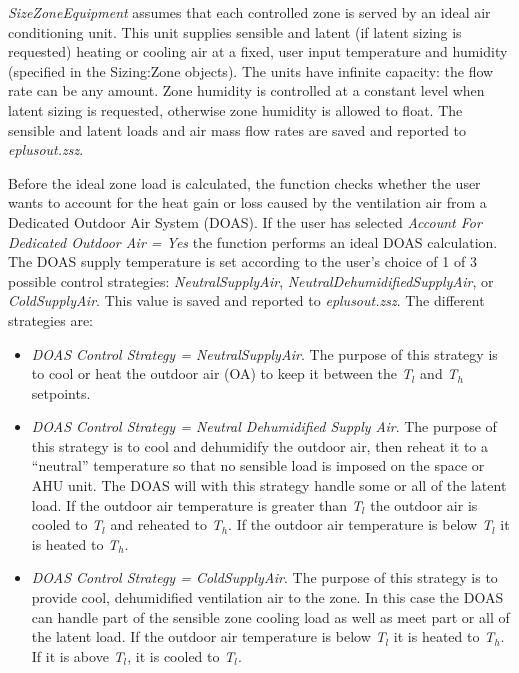 \emph{SizeZoneEquipment} assumes that each controlled zone is served by an ideal air conditioning unit. This unit supplies sensible and latent (if latent sizing is requested) heating or cooling air at a fixed, user input temperature and humidity (specified in the Sizing:Zone objects). The units have infinite capacity: the flow rate can be any amount. Zone humidity is controlled at a constant level when latent sizing is requested, otherwise zone humidity is allowed to float. The sensible and latent loads and air mass flow rates are saved and reported to \emph{eplusout.zsz}. 

Before the ideal zone load is calculated, the function checks whether the user wants to account for the heat gain or loss caused by the ventilation air from a Dedicated Outdoor Air System (DOAS). If the user has selected \emph{Account For Dedicated Outdoor Air = Yes} the function performs an ideal DOAS calculation. The DOAS supply temperature is set according to the user's choice of 1 of 3 possible control strategies: \emph{NeutralSupplyAir}, \emph{NeutralDehumidifiedSupplyAir}, or \emph{ColdSupplyAir}. This value is saved and reported to \emph{eplusout.zsz}. The different strategies are:

\begin{itemize}
\item
  \emph{DOAS Control Strategy = NeutralSupplyAir}. The purpose of this strategy is to cool or heat the outdoor air (OA) to keep it between the \emph{T\(_{l}\)} and \emph{T\(_{h}\)} setpoints.
\item
  \emph{DOAS Control Strategy = Neutral Dehumidified Supply Air}. The purpose of this strategy is to cool and dehumidify the outdoor air, then reheat it to a ``neutral'' temperature so that no sensible load is imposed on the space or AHU unit. The DOAS will with this strategy handle some or all of the latent load. If the outdoor air temperature is greater than \emph{T\(_{l}\)} the outdoor air is cooled to \emph{T\(_{l}\)} and reheated to \emph{T\(_{h}\)}. If the outdoor air temperature is below \emph{T\(_{l}\)} it is heated to \emph{T\(_{h}\)}.
\item
  \emph{DOAS Control Strategy = ColdSupplyAir}. The purpose of this strategy is to provide cool, dehumidified ventilation air to the zone. In this case the DOAS can handle part of the sensible zone cooling load as well as meet part or all of the latent load. If the outdoor air temperature is below \emph{T\(_{l}\)} it is heated to \emph{T\(_{h}\)}. If it is above \emph{T\(_{l}\)}, it is cooled to \emph{T\(_{l}\)}.
\end{itemize}

